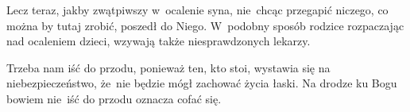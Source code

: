 \documentclass[a4paper,11pt]{article}
\begin{document}

\vspace{\spaceThree}



\noindent
Lecz teraz, jakby zwątpiwszy w~ocalenie syna, nie~chcąc przegapić
niczego, co można by tutaj zrobić, poszedł do Niego. W~podobny sposób
rodzice rozpaczając nad ocaleniem dzieci, wzywają także
niesprawdzonych lekarzy.


\vspace{\spaceThree}



\noindent
Trzeba nam iść do przodu, ponieważ ten, kto stoi, wystawia się na
niebezpieczeństwo, że~nie będzie mógł zachować życia łaski. Na drodze
ku Bogu bowiem nie~iść do przodu oznacza cofać się.













{}






\end{document}
